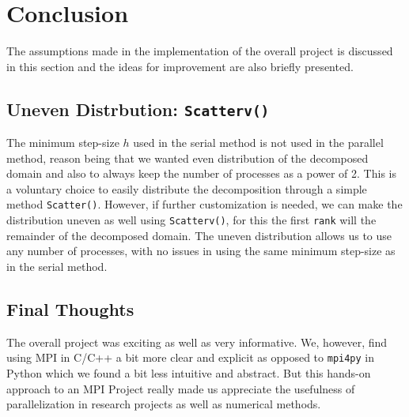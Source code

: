 \section{Conclusion}
The assumptions made in the implementation of the overall project is discussed in this section and the ideas for improvement are also briefly presented.

\subsection{Uneven Distrbution: \texttt{Scatterv()}}
The minimum step-size $h$ used in the serial method is not used in the parallel method, reason being that we wanted even distribution of the decomposed domain and also to always keep the number of processes as a power of 2. This is a voluntary choice to easily distribute the decomposition through a simple method \texttt{Scatter()}. However, if further customization is needed, we can make the distribution uneven as well using \texttt{Scatterv()}, for this the first \texttt{rank} will the remainder of the decomposed domain. The uneven distribution allows us to use any number of processes, with no issues in using the same minimum step-size as in the serial method.

\subsection{Final Thoughts}
The overall project was exciting as well as very informative. We, however, find using MPI in C/C++ a bit more clear and explicit as opposed to \texttt{mpi4py} in Python which we found a bit less intuitive and abstract. But this hands-on approach to an MPI Project really made us appreciate the usefulness of parallelization in research projects as well as numerical methods.